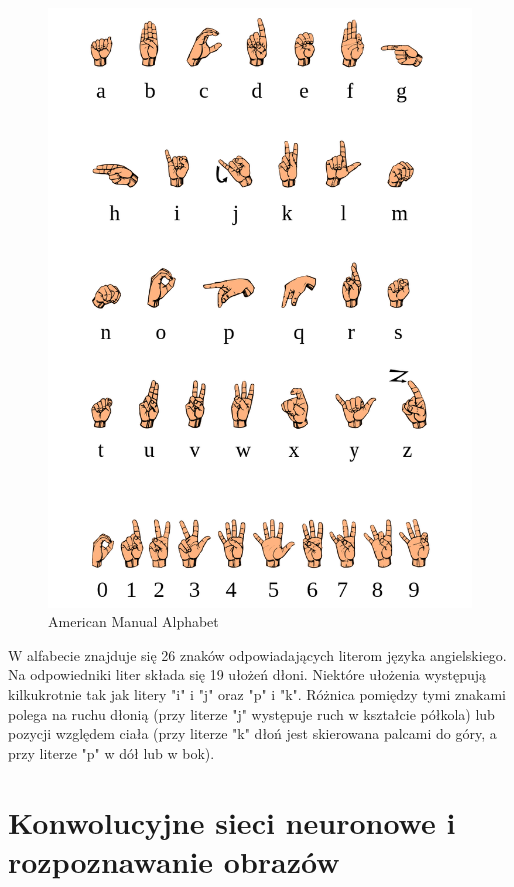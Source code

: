 \documentclass[a4paper,12pt,oneside]{book} %
\begin{document}
\begin{figure}[h]
\centering
\includegraphics[scale=0.45]{ama.png}
\caption{American Manual Alphabet\cite{wikipedia_2022}}
\end{figure}

W alfabecie znajduje się 26 znaków odpowiadających literom języka angielskiego. Na odpowiedniki liter składa się 19 ułożeń dłoni. Niektóre ułożenia występują kilkukrotnie tak jak litery "i" i "j" oraz "p" i "k". Różnica pomiędzy tymi znakami polega na ruchu dłonią (przy literze "j" występuje ruch w kształcie półkola) lub pozycji względem ciała (przy literze "k" dłoń jest skierowana palcami do góry, a przy literze "p" w dół lub w bok)\cite{costello}.


\chapter{Konwolucyjne sieci neuronowe i rozpoznawanie obrazów}
\end{document}
